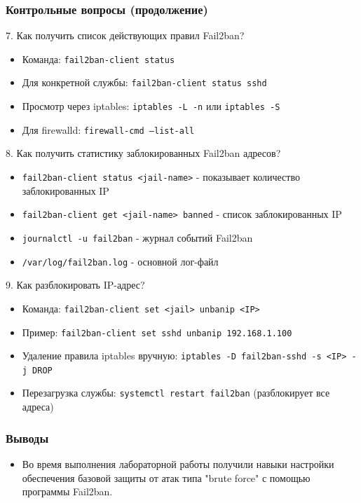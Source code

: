 \begin{frame}
\frametitle{Контрольные вопросы (продолжение)}
7. Как получить список действующих правил Fail2ban?
\begin{itemize}
    \item Команда: \texttt{fail2ban-client status}
    \item Для конкретной службы: \texttt{fail2ban-client status sshd}
    \item Просмотр через iptables: \texttt{iptables -L -n} или \texttt{iptables -S}
    \item Для firewalld: \texttt{firewall-cmd --list-all}
\end{itemize}

8. Как получить статистику заблокированных Fail2ban адресов?
\begin{itemize}
    \item \texttt{fail2ban-client status <jail-name>} - показывает количество заблокированных IP
    \item \texttt{fail2ban-client get <jail-name> banned} - список заблокированных IP
    \item \texttt{journalctl -u fail2ban} - журнал событий Fail2ban
    \item \texttt{/var/log/fail2ban.log} - основной лог-файл
\end{itemize}
\end{frame}

\begin{frame}
9. Как разблокировать IP-адрес?
\begin{itemize}
    \item Команда: \texttt{fail2ban-client set <jail> unbanip <IP>}
    \item Пример: \texttt{fail2ban-client set sshd unbanip 192.168.1.100}
    \item Удаление правила iptables вручную: \texttt{iptables -D fail2ban-sshd -s <IP> -j DROP}
    \item Перезагрузка службы: \texttt{systemctl restart fail2ban} (разблокирует все адреса)
\end{itemize}
\end{frame}

\begin{frame}
\frametitle{Выводы}
\begin{itemize}
    \item Во время выполнения лабораторной работы получили навыки настройки обеспечения базовой защиты от атак типа "brute force" с помощью программы Fail2ban.
\end{itemize}
\end{frame}

